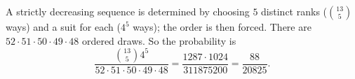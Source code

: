 A strictly decreasing sequence is determined by choosing $5$ distinct ranks ($\binom{13}5$ ways) and a suit for each ($4^5$ ways); the order is then forced. There are $52\cdot51\cdot50\cdot49\cdot48$ ordered draws. So the probability is
\[\dfrac{\binom{13}{5}4^5}{52\cdot51\cdot50\cdot49\cdot48}=\dfrac{1287\cdot1024}{311875200}=\boxed{\dfrac{88}{20825}}.\]
